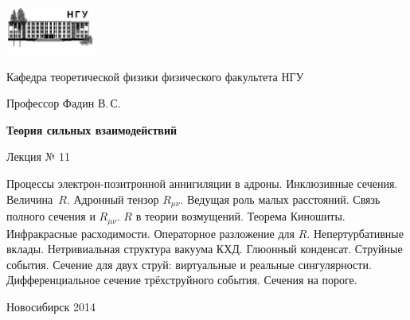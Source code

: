 \documentclass[12pt,pagesize,paper=192mm:108mm]{scrbook}
\begin{document}
\begin{titlepage}
  \vspace*{-1em}
  \begin{center}
    \includegraphics[width=0.22\textwidth]{../NSU-logo}

    Кафедра теоретической физики физического факультета НГУ
    \medskip

    \Large
    Профессор Фадин В.\,С.

    \huge
    \textbf{Теория сильных взаимодействий}
    \smallskip
    
    \Large
    Лекция № 11
    \vfill
    
    \normalsize
    \begin{minipage}{0.9\linewidth}
      Процессы электрон-позитронной аннигиляции в адроны. Инклюзивные
      сечения. Величина~$R$. Адронный тензор $R_{\mu\nu}$. Ведущая
      роль малых расстояний. Связь полного сечения и $R_{\mu\nu}$. $R$
      в теории возмущений. Теорема Киношиты. Инфракрасные
      расходимости. Операторное разложение для $R$. Непертурбативные
      вклады. Нетривиальная структура вакуума КХД. Глюонный
      конденсат. Струйные события. Сечение для двух струй: виртуальные
      и реальные сингулярности. Дифференциальное сечение трёхструйного
      события. Сечения на пороге.
    \end{minipage}
    \vfill
    
    \normalsize \ccbysa\hspace{0.5em} Новосибирск 2014   
  \end{center}
\end{titlepage}
\end{document}
